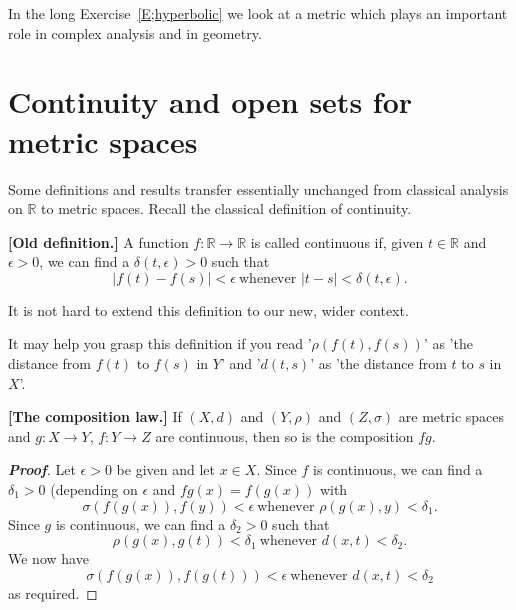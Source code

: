 In the long Exercise~\ref{E;hyperbolic} we look at a metric
which plays an important role in complex analysis and
in geometry.







\section{Continuity and open sets for metric spaces}

Some definitions and results transfer essentially unchanged
from classical analysis on ${\mathbb R}$ to metric spaces.
Recall the classical definition of continuity.
\begin{definition}{\bf [Old definition.]}
A function $f:{\mathbb R}\rightarrow{\mathbb R}$
is called continuous if, given $t\in{\mathbb R}$ and $\epsilon>0$,
we can find a $\delta(t,\epsilon)>0$ such that
\[|f(t)-f(s)|<\epsilon\ \text{whenever $|t-s|<\delta(t,\epsilon)$}.\]
\end{definition}
It is not hard to extend this definition to our new, wider context.



It may help you grasp this definition
if you read '$\rho(f(t),f(s))$' as 'the distance from $f(t)$ to $f(s)$
in $Y$'
and '$d(t,s)$' as 'the distance from $t$ to $s$ in $X$'.

\begin{theorem}{\bf [The composition law.]} \label{T;composition metric}
If $(X,d)$ and $(Y,\rho)$
and $(Z,\sigma)$ are metric spaces and $g:X\rightarrow Y$, $f:Y\rightarrow Z$
are continuous, then so is the composition $fg$.
\end{theorem}
\begin{proof}[\bf Proof] Let $\epsilon>0$ be given and let $x\in X$. Since
$f$ is continuous, we can find a $\delta_{1}>0$
(depending on $\epsilon$ and $fg(x)=f(g(x))$ with
\[\sigma(f(g(x)),f(y))<\epsilon\ \text{whenever $\rho(g(x),y)<\delta_{1}$}.\]
Since $g$ is continuous, we can find a $\delta_{2}>0$ such that
\[\rho(g(x),g(t))<\delta_{1}\ \text{whenever $d(x,t)<\delta_{2}$}.\]
We now have
\[\sigma(f(g(x)),f(g(t)))<\epsilon\ \text{whenever $d(x,t)<\delta_{2}$}\]
as required.
\end{proof}




